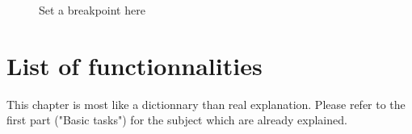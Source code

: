 \documentclass[10pt]{report}
\begin{document}
\begin{figure}[H]
\centering
{}
\caption{Set a breakpoint here}
\end{figure}


\chapter{List of functionnalities}

This chapter is most like a dictionnary than real explanation. Please refer to the first part ("Basic tasks") for the subject which are already explained.\newline
\end{document}
